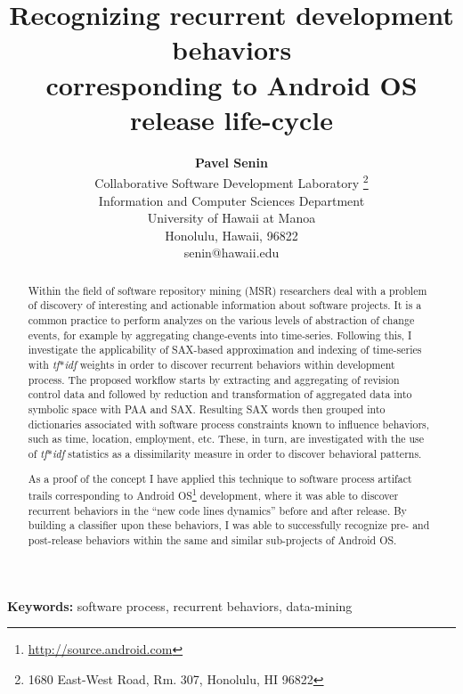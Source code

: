 \documentclass[conference]{IEEEtran}
\title{\bf Recognizing recurrent development behaviors\\ corresponding to Android OS release life-cycle}           %
\author{
{\bfseries Pavel Senin}\\
Collaborative Software Development Laboratory \thanks{1680 East-West Road, Rm. 307, Honolulu, HI 96822}\\
Information and Computer Sciences Department\\
University of Hawaii at Manoa\\
Honolulu, Hawaii, 96822\\
senin@hawaii.edu}
\begin{document}
\maketitle                        %

\begin{abstract}
Within the field of software repository mining (MSR) researchers deal with a problem 
of discovery of interesting and actionable information about software projects.
It is a common practice to perform analyzes on the various levels of abstraction 
of change events, for example by aggregating change-events into time-series.
Following this, I investigate the applicability of SAX-based approximation and 
indexing of time-series with \textit{tf$\ast$idf} weights in order to discover 
recurrent behaviors within development process. 
The proposed workflow starts by extracting and aggregating of revision control data 
and followed by reduction and transformation of aggregated data into symbolic space 
with PAA and SAX. Resulting SAX words then grouped into dictionaries associated 
with software process constraints known to influence behaviors, such as time, 
location, employment, etc. These, in turn, are investigated with the use 
of \textit{tf$\ast$idf} statistics as a dissimilarity measure in order to 
discover behavioral patterns.

As a proof of the concept I have applied this technique to software process artifact trails 
corresponding to Android OS\footnote[1]{\url{http://source.android.com}} development, where
it was able to discover recurrent behaviors in the ``new code lines dynamics'' before 
and after release. By building a classifier upon these behaviors, I was able to successfully 
recognize pre- and post-release behaviors within the same and similar sub-projects of Android OS.
\end{abstract}

\vspace{1em}
\noindent\textbf{Keywords:}
 {\small  software process, recurrent behaviors, data-mining} %

%
\end{document}

